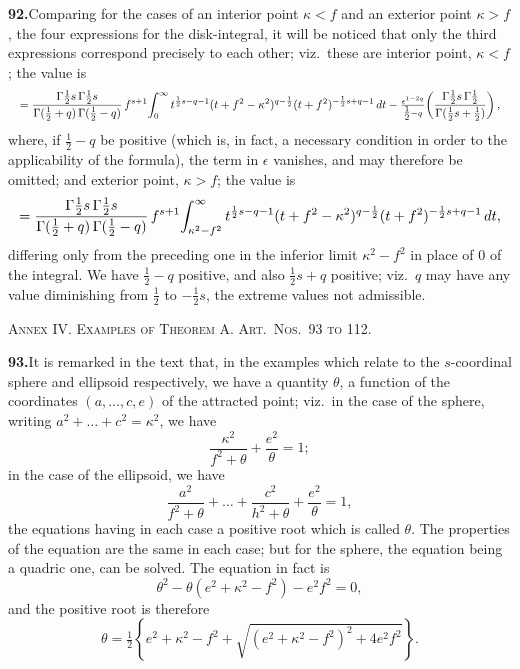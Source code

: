 \documentclass[11pt]{article}
\begin{document}
\bigskip

\noindent\textbf{92.}\quad Comparing for the cases of an interior point $\kappa<f$ and an exterior point $\kappa>f$, the four expressions for the disk-integral, it will be noticed that only the third expressions correspond precisely to each other; viz.\ these are interior point, $\kappa<f$; the value is
\[
\resizebox{\textwidth}{!}{$\displaystyle
= \frac{\Gamma\tfrac{1}{2}s\,\Gamma\tfrac{1}{2}s}{\Gamma(\tfrac{1}{2}+q)\,\Gamma(\tfrac{1}{2}-q)}\,f^{s+1}\!\int_{0}^{\infty} t^{\frac{1}{2}s-q-1}(t+f^{2}-\kappa^{2})^{q-\frac{1}{2}}(t+f^{2})^{-\frac{1}{2}s+q-1}\,dt - \tfrac{\epsilon^{1-2q}}{\tfrac{1}{2}-q}\!\left(\frac{\Gamma\tfrac{1}{2}s\,\Gamma\tfrac{1}{2}}{\Gamma(\tfrac{1}{2}s+\tfrac{1}{2})}\right),$}
\]
where, if $\tfrac{1}{2}-q$ be positive (which is, in fact, a necessary condition in order to the applicability of the formula), the term in $\epsilon$ vanishes, and may therefore be omitted; and exterior point, $\kappa>f$; the value is
\[
\resizebox{\textwidth}{!}{$\displaystyle
= \frac{\Gamma\tfrac{1}{2}s\,\Gamma\tfrac{1}{2}s}{\Gamma(\tfrac{1}{2}+q)\,\Gamma(\tfrac{1}{2}-q)}\,f^{s+1}\!\int_{\kappa^{2}-f^{2}}^{\infty} t^{\frac{1}{2}s-q-1}(t+f^{2}-\kappa^{2})^{q-\frac{1}{2}}(t+f^{2})^{-\frac{1}{2}s+q-1}\,dt,$}
\]
differing only from the preceding one in the inferior limit $\kappa^{2}-f^{2}$ in place of $0$ of the integral. We have $\tfrac{1}{2}-q$ positive, and also $\tfrac{1}{2}s+q$ positive; viz.\ $q$ may have any value diminishing from $\tfrac{1}{2}$ to $-\tfrac{1}{2}s$, the extreme values not admissible.

\bigskip
\bigskip

\begin{center}
\textsc{Annex IV. Examples of Theorem A. Art.\ Nos.\ 93 to 112.}
\end{center}

\bigskip

\noindent\textbf{93.}\quad It is remarked in the text that, in the examples which relate to the $s$-coordinal sphere and ellipsoid respectively, we have a quantity $\theta$, a function of the coordinates $(a,\ldots,c,e)$ of the attracted point; viz.\ in the case of the sphere, writing $a^{2}+\ldots+c^{2}=\kappa^{2}$, we have
\[
\frac{\kappa^{2}}{f^{2}+\theta} + \frac{e^{2}}{\theta} = 1;
\]
in the case of the ellipsoid, we have
\[
\frac{a^{2}}{f^{2}+\theta} + \ldots + \frac{c^{2}}{h^{2}+\theta} + \frac{e^{2}}{\theta} = 1,
\]
the equations having in each case a positive root which is called $\theta$. The properties of the equation are the same in each case; but for the sphere, the equation being a quadric one, can be solved. The equation in fact is
\[
\theta^{2} - \theta(e^{2}+\kappa^{2}-f^{2}) - e^{2}f^{2} = 0,
\]
and the positive root is therefore
\[
\theta = \tfrac{1}{2}\!\left\{e^{2}+\kappa^{2}-f^{2} + \sqrt{(e^{2}+\kappa^{2}-f^{2})^{2}+4e^{2}f^{2}}\right\}.
\]
\end{document}
